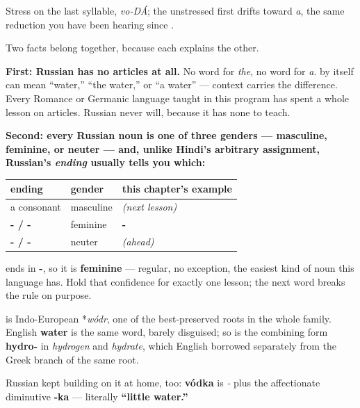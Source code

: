 Stress on the last syllable, \emph{vo-DÁ}; the unstressed first  drifts toward \emph{a}, the same reduction you have been hearing since \emph{}.

\begin{grammarlens}[title={Grammar Lens: no \textquotedblleft{}the,\textquotedblright{} no \textquotedblleft{}a\textquotedblright{} — and the ending tells you the gender}]
Two facts belong together, because each explains the other.

\textbf{First: Russian has no articles at all.} No word for \emph{the}, no word for \emph{a}. \emph{} by itself can mean \textquotedblleft{}water,\textquotedblright{} \textquotedblleft{}the water,\textquotedblright{} or \textquotedblleft{}a water\textquotedblright{} — context carries the difference. Every Romance or Germanic language taught in this program has spent a whole lesson on articles. Russian never will, because it has none to teach.

\textbf{Second: every Russian noun is one of three genders — masculine, feminine, or neuter — and, unlike Hindi's arbitrary assignment, Russian's \emph{ending} usually tells you which:}

\noindent
\begin{tabularx}{\linewidth}{@{}>{\raggedright\arraybackslash}X>{\raggedright\arraybackslash}X>{\raggedright\arraybackslash}X@{}}
\toprule
\textbf{ending} & \textbf{gender} & \textbf{this chapter's example} \\
\midrule
a consonant & masculine & \emph{(next lesson)} \\
\textbf{-\ru{а} / -\ru{я}} & feminine & \textbf{\ru{вод}-\ru{а}} \\
\textbf{-\ru{о} / -\ru{е}} & neuter & \emph{(ahead)} \\
\bottomrule
\end{tabularx}

\emph{} ends in \textbf{-}, so it is \textbf{feminine} — regular, no exception, the easiest kind of noun this language has. Hold that confidence for exactly one lesson; the next word breaks the rule on purpose.
\end{grammarlens}

\begin{cousinweb}
\textbf{} is Indo-European *\emph{wódr}, one of the best-preserved roots in the whole family. English \textbf{water} is the same word, barely disguised; so is the combining form \textbf{hydro-} in \emph{hydrogen} and \emph{hydrate}, which English borrowed separately from the Greek branch of the same root.

Russian kept building on it at home, too: \textbf{vódka} is \emph{-} plus the affectionate diminutive \textbf{-ka} — literally \textbf{\textquotedblleft{}little water.\textquotedblright{}}
\end{cousinweb}

